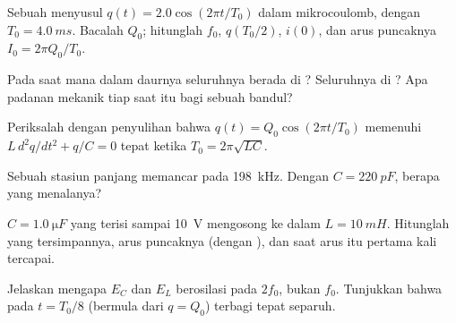 \begin{exercise}[$\star$]\label{exo:g12:rlc-oscillations:4}
Sebuah  menyusul $q(t) = 2.0\cos(2\pi t/T_0)$ dalam mikrocoulomb,
dengan $T_0 = \qty{4.0}{ms}$. Bacalah $Q_0$; hitunglah $f_0$, $q(T_0/2)$,
$i(0)$, dan arus puncaknya $I_0 = 2\pi Q_0/T_0$.
\end{exercise}

\begin{exercise}[$\star$]\label{exo:g12:rlc-oscillations:5}
Pada saat mana dalam daurnya  seluruhnya berada di
? Seluruhnya di ? Apa padanan mekanik tiap
saat itu bagi sebuah bandul?
\end{exercise}

\begin{exercise}[$\star\star$]\label{exo:g12:rlc-oscillations:6}
Periksalah dengan penyulihan bahwa $q(t) = Q_0\cos(2\pi t/T_0)$ memenuhi
$L\,d^2q/dt^2 + q/C = 0$ tepat ketika $T_0 = 2\pi\sqrt{LC}$.
\end{exercise}

\begin{exercise}[$\star\star$]\label{exo:g12:rlc-oscillations:7}
Sebuah stasiun  panjang memancar pada \qty{198}{kHz}. Dengan
$C = \qty{220}{pF}$,  berapa yang menalanya?
\end{exercise}

\begin{exercise}[$\star\star$]\label{exo:g12:rlc-oscillations:8}
$C = \qty{1.0}{\micro F}$ yang terisi sampai \qty{10}{V} mengosong ke dalam
$L = \qty{10}{mH}$. Hitunglah  yang tersimpannya, arus puncaknya (dengan
), dan saat arus itu pertama kali tercapai.
\end{exercise}

\begin{exercise}[$\star\star$]\label{exo:g12:rlc-oscillations:9}
Jelaskan mengapa $E_C$ dan $E_L$ berosilasi pada  $2f_0$, bukan $f_0$.
Tunjukkan bahwa pada $t = T_0/8$ (bermula dari $q = Q_0$)  terbagi
tepat separuh.
\end{exercise}

